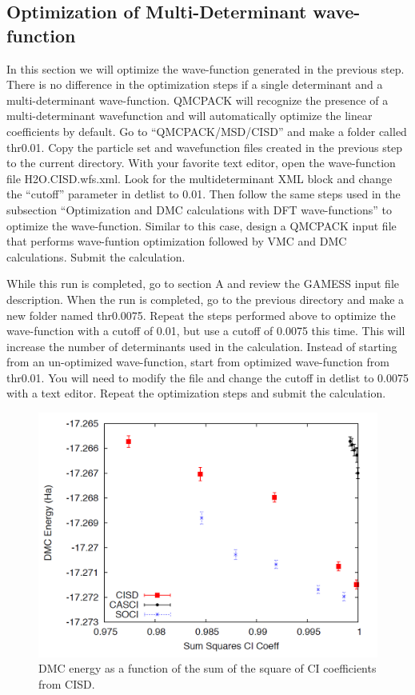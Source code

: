 \subsection{Optimization of Multi-Determinant wave-function}

In this section we will optimize the wave-function generated in the previous step. There
is no difference in the optimization steps if a single determinant and a multi-determinant
wave-function.
QMCPACK will recognize the presence of a multi-determinant wavefunction and will automatically 
optimize the linear coefficients by default. Go to “QMCPACK/MSD/CISD” and make a folder called 
thr0.01. Copy the particle set and wavefunction files created in the previous step to the current 
directory. With your favorite text editor, open the wave-function file H2O.CISD.wfs.xml. Look for 
the multideterminant XML block and change the “cutoff” parameter in detlist to 0.01. Then follow 
the same steps used in the subsection “Optimization and DMC calculations with DFT wave-functions” 
to optimize the wave-function. Similar to this case, design a QMCPACK input file that performs
wave-funtion optimization followed by VMC and DMC calculations. Submit the calculation.

While this run is completed, go to section A and review the GAMESS input file description. 
When the run is completed, go to the previous directory and make a new folder named
thr0.0075. Repeat the steps performed above to optimize the wave-function with a cutoff
of 0.01, but use a cutoff of 0.0075 this time. This will increase the number of determinants
used in the calculation. Instead of starting from an un-optimized wave-function, start from
optimized wave-function from thr0.01. You will need to modify the file and change the
cutoff in detlist to 0.0075 with a text editor. Repeat the optimization steps and submit the
calculation.

\begin{figure}
\begin{center}
\includegraphics[trim = 0mm 0mm 0mm 0mm, clip,width=0.75\columnwidth]{./figures/lab_advanced_molecules_dmc_ci_cisd}
\end{center}
\caption{DMC energy as a function of the sum of the square of CI coefficients from CISD.
\label{fig:lam_dmc_ci_cisd}
}
\end{figure}

